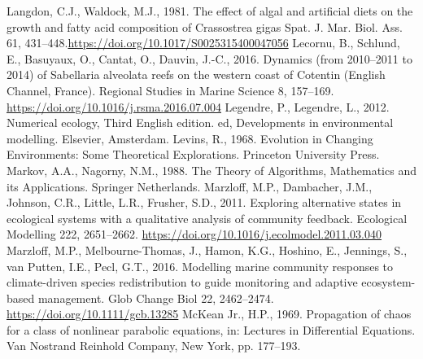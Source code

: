 \documentclass[12pt]{report}
\begin{document}
\begin{singlespacing}
\newline\newline
Langdon, C.J., Waldock, M.J., 1981. The effect of algal and artificial diets on the growth and fatty acid composition of Crassostrea gigas Spat. J. Mar. Biol. Ass. 61, 431–448.\newline \href{https://doi.org/10.1017/S0025315400047056}{https://doi.org/10.1017/S0025315400047056}
\newline\newline
Lecornu, B., Schlund, E., Basuyaux, O., Cantat, O., Dauvin, J.-C., 2016. Dynamics (from 2010–2011 to 2014) of Sabellaria alveolata reefs on the western coast of Cotentin (English Channel, France). Regional Studies in Marine Science 8, 157–169. \href{https://doi.org/10.1016/j.rsma.2016.07.004}{https://doi.org/10.1016/j.rsma.2016.07.004}
\newline\newline
Legendre, P., Legendre, L., 2012. Numerical ecology, Third English edition. ed, Developments in environmental modelling. Elsevier, Amsterdam.
\newline\newline
Levins, R., 1968. Evolution in Changing Environments: Some Theoretical Explorations. Princeton University Press.
\newline\newline
Markov, A.A., Nagorny, N.M., 1988. The Theory of Algorithms, Mathematics and its Applications. Springer Netherlands.
\newline\newline
Marzloff, M.P., Dambacher, J.M., Johnson, C.R., Little, L.R., Frusher, S.D., 2011. Exploring alternative states in ecological systems with a qualitative analysis of community feedback. Ecological Modelling 222, 2651–2662. \href{https://doi.org/10.1016/j.ecolmodel.2011.03.040}{https://doi.org/10.1016/j.ecolmodel.2011.03.040}
\newline\newline
Marzloff, M.P., Melbourne-Thomas, J., Hamon, K.G., Hoshino, E., Jennings, S., van Putten, I.E., Pecl, G.T., 2016. Modelling marine community responses to climate-driven species redistribution to guide monitoring and adaptive ecosystem-based management. Glob Change Biol 22, 2462–2474. \href{https://doi.org/10.1111/gcb.13285}{https://doi.org/10.1111/gcb.13285}
\newline\newline
McKean Jr., H.P., 1969. Propagation of chaos for a class of nonlinear parabolic equations, in: Lectures in Differential Equations. Van Nostrand Reinhold Company, New York, pp. 177–193.

\end{singlespacing}
\end{document}
